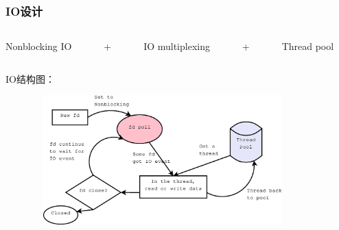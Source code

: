 \documentclass[10pt,dvipdfm]{beamer}
\begin{document}
\begin{frame}
	\frametitle{IO设计}
	\begin{columns}
		\begin{column}{0.25\textwidth}
			\begin{alertblock}{}
				Nonblocking IO
			\end{alertblock}
			
		\end{column}
		
		\begin{column}{0.02\textwidth}
			\begin{alertblock}{}
				+
			\end{alertblock}
		\end{column}
		
		\begin{column}{0.28\textwidth}
			\begin{alertblock}{}
				IO multiplexing
			\end{alertblock}
			
		\end{column}
		
		\begin{column}{0.02\textwidth}
			\begin{alertblock}{}
				+
			\end{alertblock}
		\end{column}
		
		\begin{column}{0.22\textwidth}
			\begin{alertblock}{}
				Thread pool
			\end{alertblock}
		\end{column}
	\end{columns}
	\pause
	\begin{block}{IO结构图：}
	\begin{figure}[htbp]
	\centering
	\includegraphics[height=5cm, width=10cm]{pics/IO.eps}
	\end{figure}
	\end{block}
	
\end{frame}
\end{document}
